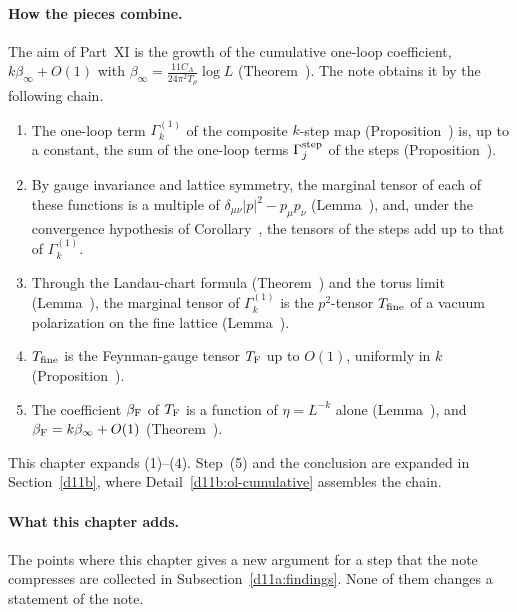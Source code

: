 \paragraph{How the pieces combine.} The aim of Part~XI is the growth of the cumulative one-loop coefficient, $k\beta_\infty+O(1)$ with $\beta_\infty=\frac{11C_A}{24\pi^2T_\rho}\log L$ (Theorem~). The note obtains it by the following chain.
\begin{enumerate}[label=(\arabic*)]
\item The one-loop term $\Gamma^{(1)}_k$ of the composite $k$-step map (Proposition~) is, up to a constant, the sum of the one-loop terms $\Gamma^{\rm step}_j$ of the steps (Proposition~).
\item By gauge invariance and lattice symmetry, the marginal tensor of each of these functions is a multiple of $\delta_{\mu\nu}|p|^2-p_\mu p_\nu$ (Lemma~), and, under the convergence hypothesis of Corollary~, the tensors of the steps add up to that of $\Gamma^{(1)}_k$.
\item Through the Landau-chart formula (Theorem~) and the torus limit (Lemma~), the marginal tensor of $\Gamma^{(1)}_k$ is the $p^2$-tensor $T_{\rm fine}$ of a vacuum polarization on the fine lattice (Lemma~).
\item $T_{\rm fine}$ is the Feynman-gauge tensor $T_{\rm F}$ up to $O(1)$, uniformly in $k$ (Proposition~).
\item The coefficient $\beta_{\rm F}$ of $T_{\rm F}$ is a function of $\eta=L^{-k}$ alone (Lemma~), and $\beta_{\rm F}=k\beta_\infty+O(1)$ (Theorem~).
\end{enumerate}
This chapter expands (1)--(4). Step~(5) and the conclusion are expanded in Section~\ref{d11b}, where Detail~\ref{d11b:ol-cumulative} assembles the chain.

\paragraph{What this chapter adds.} The points where this chapter gives a new argument for a step that the note compresses are collected in Subsection~\ref{d11a:findings}. None of them changes a statement of the note.

